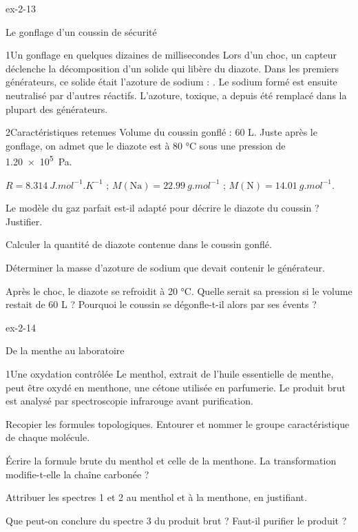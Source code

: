 \begin{blocLivre}{ex-2-13}
\begin{exercice}[3]{Le gonflage d'un coussin de sécurité}
\begin{docu}{1}{Un gonflage en quelques dizaines de millisecondes}
Lors d'un choc, un capteur déclenche la décomposition d'un solide qui libère du diazote. Dans les premiers
générateurs, ce solide était l'azoture de sodium : . Le sodium formé est
ensuite neutralisé par d'autres réactifs. L'azoture, toxique, a depuis été remplacé dans la plupart des générateurs.
\end{docu}
\begin{docu}{2}{Caractéristiques retenues}
Volume du coussin gonflé : 60 L. Juste après le gonflage, on admet que le diazote est à 80 °C sous une
pression de \qty{1,20e5}{Pa}.
\end{docu}
\begin{donnees}
$R=\qty{8,314}{J.mol^{-1}.K^{-1}}$ ; $M(\mathrm{Na})=\qty{22,99}{g.mol^{-1}}$ ; $M(\mathrm{N})=\qty{14,01}{g.mol^{-1}}$.
\end{donnees}
\begin{questions}
\item Le modèle du gaz parfait est-il adapté pour décrire le diazote du coussin ? Justifier.
\item Calculer la quantité de diazote contenue dans le coussin gonflé.
\item \initiative Déterminer la masse d'azoture de sodium que devait contenir le générateur.
\item Après le choc, le diazote se refroidit à 20 °C. Quelle serait sa pression si le volume restait de 60 L ?
Pourquoi le coussin se dégonfle-t-il alors par ses évents ?
\end{questions}
\end{exercice}
\end{blocLivre}
\begin{blocLivre}{ex-2-14}
\begin{exercice}[3]{De la menthe au laboratoire}
\begin{docu}{1}{Une oxydation contrôlée}
Le menthol, extrait de l'huile essentielle de menthe, peut être oxydé en menthone, une cétone utilisée en parfumerie.
Le produit brut est analysé par spectroscopie infrarouge avant purification.
\end{docu}
\begin{questions}
\item Recopier les formules topologiques. Entourer et nommer le groupe caractéristique de chaque molécule.
\item Écrire la formule brute du menthol et celle de la menthone. La transformation modifie-t-elle la chaîne carbonée ?
\item Attribuer les spectres 1 et 2 au menthol et à la menthone, en justifiant.
\item \initiative Que peut-on conclure du spectre 3 du produit brut ? Faut-il purifier le produit ?
\end{questions}
\end{exercice}
\end{blocLivre}
